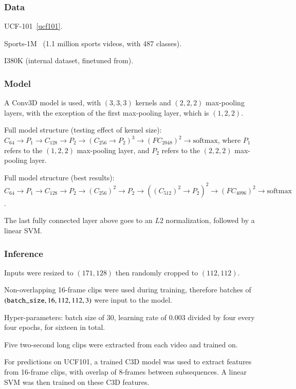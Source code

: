 \documentclass[a4paper, 12pt]{article}
\begin{document}
\subsubsection{Data}

UCF-101~\ref{ucf101}.

Sports-1M~\citet{KarpathyCVPR14} (1.1 million sports videos, with 487 classes).

I380K (internal dataset, finetuned from).

\subsubsection{Model}

A Conv3D model is used, with $(3, 3, 3)$ kernels and $(2, 2, 2)$ max-pooling
layers, with the exception of the first max-pooling layer, which is
$(1, 2, 2)$.

Full model structure (testing effect of kernel size):
$C_{64} \rightarrow P_1 \rightarrow C_{128} \rightarrow P_2 \rightarrow
{(C_{256} \rightarrow P_2)}^3 \rightarrow {(FC_{2048})}^2 \rightarrow
\textrm{softmax}$, where $P_1$ refers to the $(1, 2, 2)$ max-pooling layer, and
$P_2$ refers to the $(2, 2, 2)$ max-pooling layer.

Full model structure (best results):
$C_{64} \rightarrow P_1 \rightarrow C_{128} \rightarrow P_2 \rightarrow
{(C_{256})}^2 \rightarrow P_2 \rightarrow
{({(C_{512})}^2 \rightarrow P_2)}^2 \rightarrow {(FC_{4096})}^2 \rightarrow
\textrm{softmax}$.

The last fully connected layer above goes to an $L2$ normalization, followed by
a linear SVM\@.

\subsubsection{Inference}

Inputs were resized to $(171, 128)$ then randomly cropped to $(112, 112)$.

Non-overlapping 16-frame clips were used during training, therefore batches of
$(\verb|batch_size|, 16, 112, 112, 3)$ were input to the model.

Hyper-parameters: batch size of 30, learning rate of 0.003 divided by four
every four epochs, for sixteen in total.

Five two-second long clips were extracted from each video and trained on.

For predictions on UCF101, a trained C3D model was used to extract features
from 16-frame clips, with overlap of 8-frames between subsequences. A linear
SVM was then trained on these C3D features.
\end{document}
